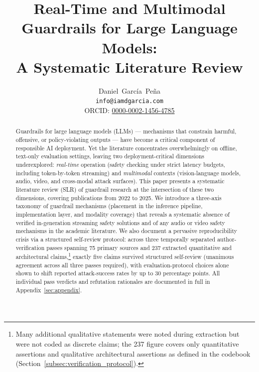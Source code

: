 \documentclass[12pt,a4paper]{article}
\begin{document}
\title{Real-Time and Multimodal Guardrails for Large Language Models:\\
A Systematic Literature Review}

\author{Daniel~Garc\'ia~Pe\~na\\[4pt]
  \small\texttt{info@iamdgarcia.com}\\
  \small ORCID: \href{https://orcid.org/0000-0002-1456-4785}{0000-0002-1456-4785}
}

\maketitle

\begin{abstract}
Guardrails for large language models (LLMs) — mechanisms that constrain harmful,
offensive, or policy-violating outputs — have become a critical component of responsible
AI deployment.
Yet the literature concentrates overwhelmingly on offline, text-only evaluation settings,
leaving two deployment-critical dimensions underexplored:
\emph{real-time} operation (safety checking under strict latency budgets, including
token-by-token streaming) and \emph{multimodal} contexts (vision-language models, audio,
video, and cross-modal attack surfaces).
This paper presents a systematic literature review (SLR) of guardrail research at the
intersection of these two dimensions, covering publications from 2022 to 2025.
We introduce a three-axis taxonomy of guardrail mechanisms (placement in the inference
pipeline, implementation layer, and modality coverage) that reveals a systematic absence
of verified in-generation streaming safety solutions and of any audio or video safety
mechanisms in the academic literature.
We also document a pervasive reproducibility crisis via a structured self-review
protocol: across three temporally separated author-verification passes spanning 75
primary sources and 237 extracted quantitative and architectural claims,\footnote{Many
additional qualitative statements were noted during extraction but were not coded as
discrete claims; the 237 figure covers only quantitative assertions and qualitative
architectural assertions as defined in the codebook (Section~\ref{subsec:verification_protocol}).}
exactly five claims survived structured self-review (unanimous agreement across all
three passes required), with evaluation-protocol choices alone shown to shift reported
attack-success rates by up to 30 percentage points.
All individual pass verdicts and refutation rationales are documented in full in
Appendix~\ref{sec:appendix}.

\end{abstract}
\end{document}
